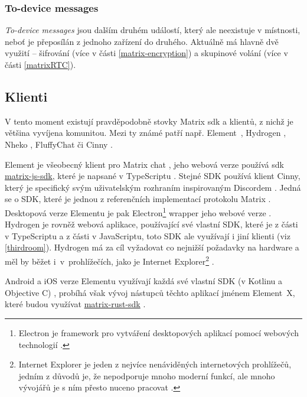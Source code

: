 \subsubsection{To-device messages}\label{toDeviceMessages}

\textit{To-device messages} jsou dalším druhém událostí, který ale neexistuje v
místnosti, neboť je přeposílán z jednoho zařízení do druhého. Aktuálně má hlavně
dvě využití -- šifrování (více v části \ref{matrix-encryption}) a skupinové
volání (více v části \ref{matrixRTC}).

\subsection{Klienti}

V tento moment existují pravděpodobně stovky Matrix \gls{sdk} a klientů, z nichž
je většina vyvíjena komunitou. Mezi ty známé patří např.
Element~\parencite{Element-Homepage}, Hydrogen \parencite{GitHub-Hydrogen},
Nheko \parencite{GitHub-Nheko}, FluffyChat \parencite{FluffyChat-Homepage} či
Cinny \parencite{Cinny-Homepage}.

Element je všeobecný klient pro Matrix chat \parencite{Element-Homepage}, jeho
webová verze používá \gls{sdk}
\href{https://github.com/matrix-org/matrix-js-sdk/}{matrix-js-sdk}, které je
napsané v TypeScriptu \parencite{GitHub-MatrixJSSDK}. Stejné SDK používá klient
Cinny, který je specifický svým uživatelským rozhraním inspirovaným Discordem
\parencite{Cinny-Homepage,GitHub-Cinny}. Jedná se o SDK, které je jednou z
referenčních implementací protokolu Matrix \parencite{GitHub-MatrixJSSDK}.
Desktopová verze Elementu je pak Electron\footnote{ Electron je framework pro
    vytváření desktopových aplikací pomocí webových technologií
    \parencite{ElectronJS-Homepage}. } wrapper jeho webové verze
\parencite{GitHub-ElementDesktop}. Hydrogen je rovněž webová aplikace,
používající své vlastní SDK, které je z části v TypeScriptu a z části v
JavaScriptu, toto SDK ale využívají i jiní klienti (viz \ref{thirdroom}).
Hydrogen má za cíl vyžadovat co nejnižší požadavky na hardware a měl by běžet
i~v~prohlížečích, jako je Internet Explorer\footnote{ Internet Explorer je jeden
    z nejvíce nenáviděných internetových prohlížečů, jedním z důvodů je, že
    nepodporuje mnoho moderní funkcí, ale mnoho vývojářů je s ním přesto nuceno
    pracovat \parencite{ZealousSites-WhyDoWebDevelopersHateInternetExplorer}. }
\parencite{GitHub-Hydrogen}.

Android a iOS verze Elementu využívají každá své vlastní SDK (v Kotlinu a
Objective C) \parencite{GitHub-ElementAndroid,GitHub-ElementIOS}, probíhá však
vývoj nástupců těchto aplikací jménem Element~X, které budou využívat
\href{https://github.com/matrix-org/matrix-rust-sdk}{matrix-rust-sdk}
\parencite{GitHub-ElementXAndroid,GitHub-ElementXIOS}.

